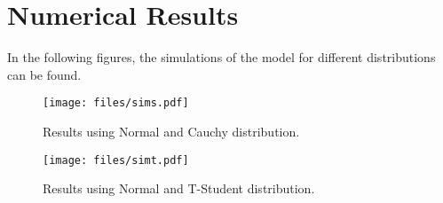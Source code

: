 \section{Numerical Results}\label{sec:numRes}
In the following figures, the simulations of the model for different distributions can be found.
\begin{figure}[h]
  \centering
  \texttt{[image: files/sims.pdf]}
  \caption{Results using Normal and Cauchy distribution.}
\end{figure}

\begin{figure}[h]
  \centering
  \texttt{[image: files/simt.pdf]}
  \caption{Results using Normal and T-Student distribution.}
\end{figure}
